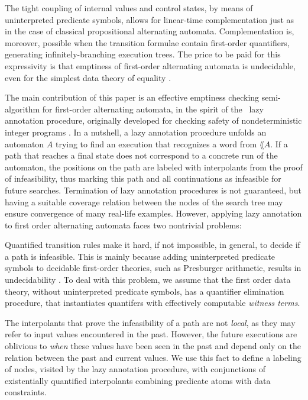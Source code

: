 The tight coupling of internal values and control states, by means of
uninterpreted predicate symbols, allows for linear-time
complementation just as in the case of classical propositional
alternating automata. Complementation is, moreover, possible when the
transition formulae contain first-order quantifiers, generating
infinitely-branching execution trees. The price to be paid for this
expressivity is that emptiness of first-order alternating automata is
undecidable, even for the simplest data theory of equality
\cite{Farzan15}.

The main contribution of this paper is an effective emptiness checking
semi-algorithm for first-order alternating automata, in the spirit of
the \impact~lazy annotation procedure, originally developed for
checking safety of nondeterministic integer programs
\cite{McMillan06,McMillan14}. In a nutshell, a lazy annotation
procedure unfolds an automaton $A$ trying to find an execution that
recognizes a word from $\lang{A}$. If a path that reaches a final
state does not correspond to a concrete run of the automaton, the
positions on the path are labeled with interpolants from the proof of
infeasibility, thus marking this path and all continuations as
infeasible for future searches. Termination of lazy annotation
procedures is not guaranteed, but having a suitable coverage relation
between the nodes of the search tree may ensure convergence of many
real-life examples. However, applying lazy annotation to first order
alternating automata faces two nontrivial
problems: \begin{compactenum}
\item Quantified transition rules make it hard, if not impossible, in
  general, to decide if a path is infeasible. This is mainly because
  adding uninterpreted predicate symbols to decidable first-order
  theories, such as Presburger arithmetic, results in undecidability
  \cite{Halpern91}. To deal with this problem, we assume that the
  first order data theory, without uninterpreted predicate symbols,
  has a quantifier elimination procedure, that instantiates quantifers
  with effectively computable \emph{witness terms}.
%
\item The interpolants that prove the infeasibility of a path are not
  \emph{local}, as they may refer to input values encountered in the
  past. However, the future executions are oblivious to \emph{when}
  these values have been seen in the past and depend only on the
  relation between the past and current values. We use this fact to
  define a labeling of nodes, visited by the lazy annotation
  procedure, with conjunctions of existentially quantified
  interpolants combining predicate atoms with data constraints.
\end{compactenum}

